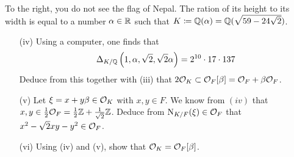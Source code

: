 \documentclass[a4paper,11pt]{article}
\begin{document}
To the right, you do not see the flag of Nepal. The ration of its height to its 
width is equal to a number $\alpha \in \mathbb{R}$ such that $K \coloneqq \mathbb{Q}(\alpha)
= \mathbb{Q}(\sqrt{59-24\sqrt 2})$.
\begin{enumerate}
    \item[(iv)]  Using a computer, one finds that 
        \begin{equation*}
            \Delta_{K/\mathbb{Q}} \left(1, \alpha, \sqrt 2, \sqrt 2 \alpha \right)
            = 2^{10} \cdot 17 \cdot 137
        \end{equation*}
        Deduce from this together with (iii) that 
        $2 \mathcal{O}_K \subset \mathcal{O}_F[\beta] = \mathcal{O}_F + \beta \mathcal{O}_F$. 
    \item[(v)]  Let $\xi = x + y\beta \in \mathcal{O}_K$ with $x,y \in F$. 
        We know from $(iv)$ that $x, y \in \frac 12 \mathcal{O}_F = \allowbreak
        \frac 12 \mathbb{Z} + \frac 1{\sqrt 2} \mathbb{Z}$. Deduce from 
        $\operatorname{N}_{K/F}(\xi) \in \mathcal{O}_F$ that $x^2 - \sqrt 2 xy - y^2 \in \mathcal{O}_F$. 
    \item [(vi)] Using (iv) and (v), show that $\mathcal{O}_K = \mathcal{O}_F[\beta]$. 
\end{enumerate}
\end{document}
